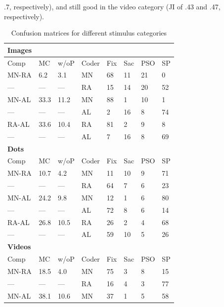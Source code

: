 .7, respectively), and still good in the video category (JI of .43 and .47, respectively). \\


\begin{table}[h!]
	\caption{Confusion matrices for different stimulus categories}
	\label{tab:mclf}       %
	\begin{tabular}{llllllll}
		\textbf{Images}&&&&&&&\\
		\hline\noalign{\smallskip}
		Comp & MC & w/oP & Coder & Fix & Sac & PSO & SP \\
		\noalign{\smallskip}\hline\noalign{\smallskip}
		MN-RA & 6.2 & 3.1 & MN & 68 & 11 & 21 & 0  \\
		--- & --- & --- & RA & 15 & 14 & 20 & 52 \\
		MN-AL & 33.3 & 11.2 & MN & 88 & 1 & 10 & 1 \\
		--- & --- & --- & AL & 2 &  16 & 8 & 74 \\
		RA-AL & 33.6 & 10.4 & RA & 81 & 2 & 9 & 8 \\
		---& ---& ---& AL & 7 & 16 & 8 & 69 \\
		\noalign{\smallskip}
		\textbf{Dots}&&&&&&&\\
		\hline\noalign{\smallskip}
		Comp & MC & w/oP & Coder & Fix & Sac & PSO & SP \\
		\noalign{\smallskip}\hline\noalign{\smallskip}
		MN-RA & 10.7 & 4.2 & MN & 11 & 10 & 9 & 71  \\
		--- & --- & --- & RA & 64 & 7 & 6 & 23 \\
		MN-AL & 24.2 & 9.8 & MN & 12 & 1 & 6 & 80 \\
		--- & --- & --- & AL & 72 & 8 & 6 & 14\\
		RA-AL & 26.8 & 10.5 & RA & 26 & 2 & 4 & 68 \\
		---& ---& ---& AL & 59 & 10 & 5 & 26 \\
		\noalign{\smallskip}
		\textbf{Videos}&&&&&&&\\
		\hline\noalign{\smallskip}
		Comp & MC & w/oP & Coder & Fix & Sac & PSO & SP \\
		\noalign{\smallskip}\hline\noalign{\smallskip}
		MN-RA & 18.5 & 4.0 & MN & 75 & 3 & 8 & 15 \\
		--- & --- & --- & RA & 16 & 4 & 3 & 77 \\
		MN-AL & 38.1 & 10.6 & MN & 37 & 1 & 5 & 58 \\

\end{tabular}
\end{table}
